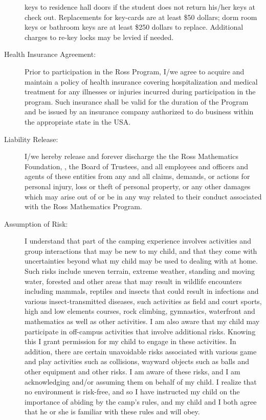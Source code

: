 \documentclass{ross}
\begin{document}
\begin{description}
keys to residence hall doors if the student does not return his/her
keys at check out.  Replacements for key-cards are at least \$50
dollars; dorm room keys or bathroom keys are at least \$250 dollars to
replace.  Additional charges to re-key locks may be levied if needed.
\item[Health Insurance Agreement:] Prior to participation in the Ross
  Program, I/we agree to acquire and maintain a policy of health
  insurance covering hospitalization and medical treatment for any
  illnesses or injuries incurred during participation in the
  program. Such insurance shall be valid for the duration of the
  Program and be issued by an insurance company authorized to do
  business within the appropriate state in the USA.
\item[Liability Release:] I/we hereby release and forever discharge
  the the Ross Mathematics Foundation, 
  \campus, the Board  of Trustees, and 
  all employees and officers and agents of these entities from any
  and all claims, demands, or actions for personal injury, loss or
  theft of personal property, or any other damages which may arise out
  of or be in any way related to their conduct associated with the
  Ross Mathematics Program.
\item[Assumption of Risk:]  I understand that part of the camping experience involves activities and group interactions that may be new to my child, and that they come with uncertainties beyond what my child may be used to dealing with at home. Such risks include uneven terrain, extreme weather, standing and moving water, forested and other areas that may result in wildlife encounters including mammals, reptiles and insects that could result in infections and various insect-transmitted diseases, such activities as field and court sports, high and low elements courses, rock climbing, gymnastics, waterfront and mathematics as well as other activities. I am also aware that my child may participate in off-campus activities that involve additional risks. Knowing this I grant permission for my child to engage in these activities. In addition, there are certain unavoidable risks associated with various game and play activities such as collisions, wayward objects such as balls and other equipment and other risks. I am aware of these risks, and I am acknowledging and/or assuming them on behalf of my child. I realize that no environment is risk-free, and so I have instructed my child on the importance of abiding by the camp’s rules, and my child and I both agree that he or she is familiar with these rules and will obey.

\end{description}
\end{document}
